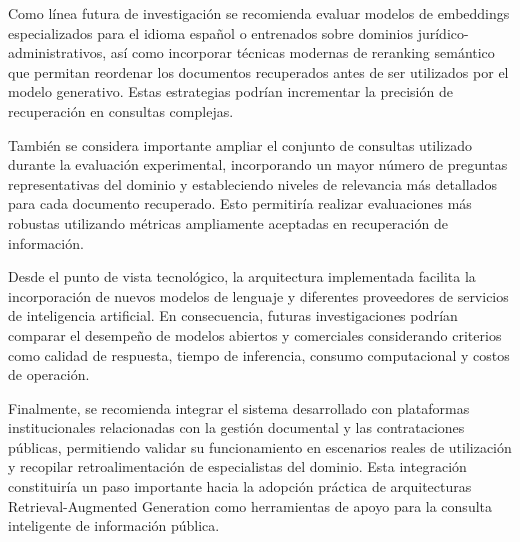 Como línea futura de investigación se recomienda evaluar modelos de embeddings especializados para el idioma español o entrenados sobre dominios jurídico-administrativos, así como incorporar técnicas modernas de reranking semántico que permitan reordenar los documentos recuperados antes de ser utilizados por el modelo generativo. Estas estrategias podrían incrementar la precisión de recuperación en consultas complejas.

También se considera importante ampliar el conjunto de consultas utilizado durante la evaluación experimental, incorporando un mayor número de preguntas representativas del dominio y estableciendo niveles de relevancia más detallados para cada documento recuperado. Esto permitiría realizar evaluaciones más robustas utilizando métricas ampliamente aceptadas en recuperación de información.

Desde el punto de vista tecnológico, la arquitectura implementada facilita la incorporación de nuevos modelos de lenguaje y diferentes proveedores de servicios de inteligencia artificial. En consecuencia, futuras investigaciones podrían comparar el desempeño de modelos abiertos y comerciales considerando criterios como calidad de respuesta, tiempo de inferencia, consumo computacional y costos de operación.

Finalmente, se recomienda integrar el sistema desarrollado con plataformas institucionales relacionadas con la gestión documental y las contrataciones públicas, permitiendo validar su funcionamiento en escenarios reales de utilización y recopilar retroalimentación de especialistas del dominio. Esta integración constituiría un paso importante hacia la adopción práctica de arquitecturas Retrieval-Augmented Generation como herramientas de apoyo para la consulta inteligente de información pública.